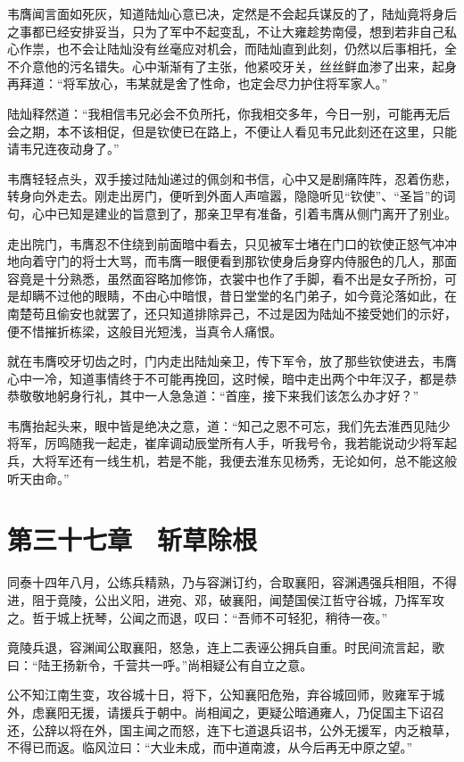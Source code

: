 韦膺闻言面如死灰，知道陆灿心意已决，定然是不会起兵谋反的了，陆灿竟将身后之事都已经安排妥当，只为了军中不起变乱，不让大雍趁势南侵，想到若非自己私心作祟，也不会让陆灿没有丝毫应对机会，而陆灿直到此刻，仍然以后事相托，全不介意他的污名错失。心中渐渐有了主张，他紧咬牙关，丝丝鲜血渗了出来，起身再拜道：“将军放心，韦某就是舍了性命，也定会尽力护住将军家人。”

陆灿释然道：“我相信韦兄必会不负所托，你我相交多年，今日一别，可能再无后会之期，本不该相促，但是钦使已在路上，不便让人看见韦兄此刻还在这里，只能请韦兄连夜动身了。”

韦膺轻轻点头，双手接过陆灿递过的佩剑和书信，心中又是剧痛阵阵，忍着伤悲，转身向外走去。刚走出房门，便听到外面人声喧嚣，隐隐听见“钦使”、“圣旨”的词句，心中已知是建业的旨意到了，那亲卫早有准备，引着韦膺从侧门离开了别业。

走出院门，韦膺忍不住绕到前面暗中看去，只见被军士堵在门口的钦使正怒气冲冲地向着守门的将士大骂，而韦膺一眼便看到那钦使身后身穿内侍服色的几人，那面容竟是十分熟悉，虽然面容略加修饰，衣裳中也作了手脚，看不出是女子所扮，可是却瞒不过他的眼睛，不由心中暗恨，昔日堂堂的名门弟子，如今竟沦落如此，在南楚苟且偷安也就罢了，还只知道排除异己，不过是因为陆灿不接受她们的示好，便不惜摧折栋梁，这般目光短浅，当真令人痛恨。

就在韦膺咬牙切齿之时，门内走出陆灿亲卫，传下军令，放了那些钦使进去，韦膺心中一冷，知道事情终于不可能再挽回，这时候，暗中走出两个中年汉子，都是恭恭敬敬地躬身行礼，其中一人急急道：“首座，接下来我们该怎么办才好？”

韦膺抬起头来，眼中皆是绝决之意，道：“知己之恩不可忘，我们先去淮西见陆少将军，厉鸣随我一起走，崔庠调动辰堂所有人手，听我号令，我若能说动少将军起兵，大将军还有一线生机，若是不能，我便去淮东见杨秀，无论如何，总不能这般听天由命。”

\chapter{第三十七章　斩草除根}

同泰十四年八月，公练兵精熟，乃与容渊订约，合取襄阳，容渊遇强兵相阻，不得进，阻于竟陵，公出义阳，进宛、邓，破襄阳，闻楚国侯江哲守谷城，乃挥军攻之。哲于城上抚琴，公闻之而退，叹曰：“吾师不可轻犯，稍待一夜。”

竟陵兵退，容渊闻公取襄阳，怒急，连上二表诬公拥兵自重。时民间流言起，歌曰：“陆王扬新令，千营共一呼。”尚相疑公有自立之意。

公不知江南生变，攻谷城十日，将下，公知襄阳危殆，弃谷城回师，败雍军于城外，虑襄阳无援，请援兵于朝中。尚相闻之，更疑公暗通雍人，乃促国主下诏召还，公辞以将在外，国主闻之而怒，连下七道退兵诏书，公外无援军，内乏粮草，不得已而返。临风泣曰：“大业未成，而中道南渡，从今后再无中原之望。”

